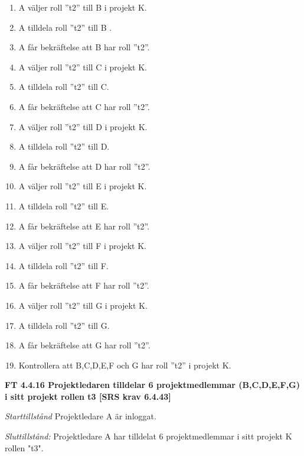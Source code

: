 \documentclass[a4paper]{article}
\begin{document}
\begin{enumerate}
\item A väljer roll ”t2” till B i projekt K.
\item A tilldela roll ”t2” till B . 
\item A får bekräftelse att B har roll ”t2”.
\item A väljer roll ”t2” till C i projekt K.
\item A tilldela roll ”t2” till C. 
\item A får bekräftelse att C har roll ”t2”.
\item A väljer roll ”t2” till D i projekt K. 
\item A tilldela roll ”t2” till D. 
\item A får bekräftelse att D har roll ”t2”.
\item A väljer roll ”t2” till E i projekt K. 
\item A tilldela roll ”t2” till E. 
\item A får bekräftelse att  E har roll ”t2”.
\item A väljer roll ”t2” till F i projekt K. 
\item A tilldela roll ”t2” till F.
\item A får bekräftelse att  F har roll ”t2”.
\item A väljer roll ”t2” till G i projekt K. 
\item A tilldela roll ”t2” till G. 
\item A får bekräftelse att G har roll ”t2”.

\item Kontrollera att B,C,D,E,F och G har roll ”t2” i projekt K.
\end{enumerate}

\textbf{FT 4.4.16 Projektledaren tilldelar 6 projektmedlemmar (B,C,D,E,F,G) i sitt projekt rollen t3 [SRS krav 6.4.43]}

\emph{Starttillstånd} Projektledare A är inloggat.

\emph{Sluttillstånd:} Projektledare A  har tilldelat 6 projektmedlemmar i sitt projekt K rollen "t3".
\end{document}
